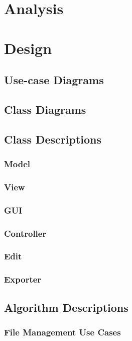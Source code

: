 \documentclass[a4paper]{article}
\begin{document}

\newpage
\tableofcontents 
\newpage

\section{Analysis}
	
\section{Design}
	\subsection{Use-case Diagrams}
	\subsection{Class Diagrams}
	\subsection{Class Descriptions}
		\subsubsection{Model}
			
		\subsubsection{View}
		\subsubsection{GUI}
		\subsubsection{Controller}
		\subsubsection{Edit}
		\subsubsection{Exporter}
	\subsection{Algorithm Descriptions}
		\subsubsection{File Management Use Cases}
\end{document}
